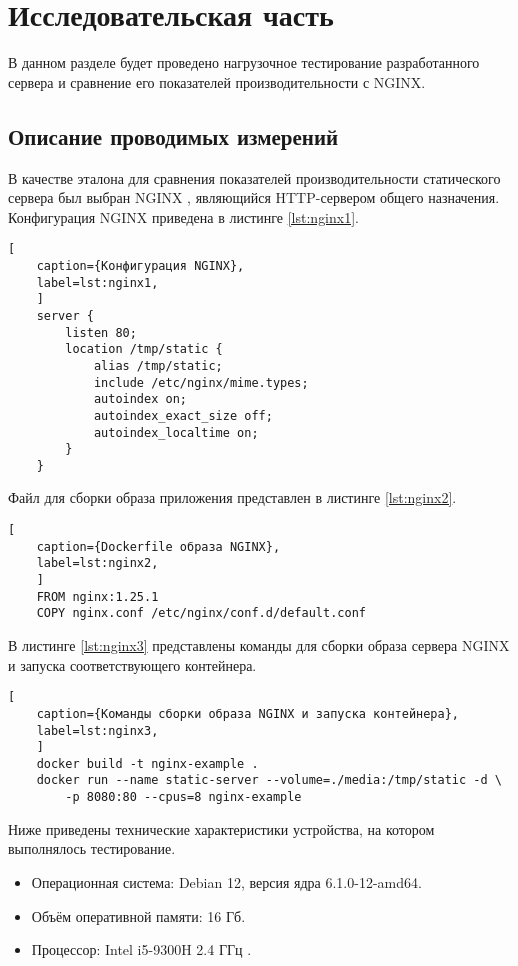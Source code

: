 \chapter{Исследовательская часть}

В данном разделе будет проведено нагрузочное тестирование разработанного сервера и сравнение его показателей производительности с NGINX.

\section{Описание проводимых измерений}

В качестве эталона для сравнения показателей производительности статического сервера был выбран NGINX \cite{nginx}, являющийся HTTP-сервером общего назначения. Конфигурация NGINX приведена в листинге \ref{lst:nginx1}.

\begin{lstlisting}[
	caption={Конфигурация NGINX},
	label=lst:nginx1,
	]
	server {
		listen 80;
		location /tmp/static {
			alias /tmp/static;
			include /etc/nginx/mime.types;
			autoindex on;
			autoindex_exact_size off;
			autoindex_localtime on;
		}
	}
\end{lstlisting}

Файл для сборки образа приложения представлен в листинге \ref{lst:nginx2}.

\begin{lstlisting}[
	caption={Dockerfile образа NGINX},
	label=lst:nginx2,
	]
	FROM nginx:1.25.1
	COPY nginx.conf /etc/nginx/conf.d/default.conf
\end{lstlisting}

В листинге \ref{lst:nginx3} представлены команды для сборки образа сервера NGINX и запуска соответствующего контейнера.

\begin{lstlisting}[
	caption={Команды сборки образа NGINX и запуска контейнера},
	label=lst:nginx3,
	]
	docker build -t nginx-example .
	docker run --name static-server --volume=./media:/tmp/static -d \
		-p 8080:80 --cpus=8 nginx-example
\end{lstlisting}

Ниже приведены технические характеристики устройства, на котором выполнялось тестирование.

\begin{itemize}
	\item Операционная система: Debian 12, версия ядра 6.1.0-12-amd64.
	\item Объём оперативной памяти: 16 Гб.
	\item Процессор: Intel i5-9300H 2.4 ГГц \cite{intel}.
\end{itemize}

